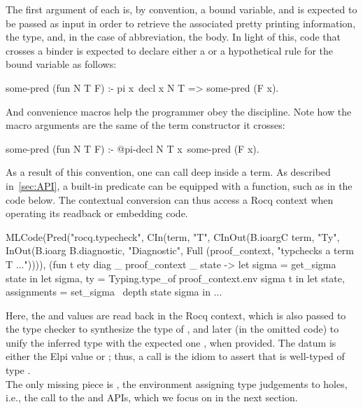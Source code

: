 \documentclass{these-ISSS}
\newenvironment{elpicode}
  {\VerbatimEnvironment\begin{elpibox}\begin{xelpicode}}{\end{xelpicode}
\end{elpibox}}
\newenvironment{ocamlcode}
  {\VerbatimEnvironment\begin{ocamlbox}\begin{xocamlcode}}{\end{xocamlcode}
\end{ocamlbox}}
\begin{document}
The first argument of each is, by convention, a bound variable, and is
expected to be passed as input in order to retrieve the associated pretty
printing information, the type, and, in the case of abbreviation, the body. In
light of this, code that crosses a binder is expected to declare either a
 or a  hypothetical rule for the bound variable as
follows:
\begin{elpicode}
some-pred (fun N T F) :-
  pi x\ decl x N T => some-pred (F x).
\end{elpicode}
\noindent
And convenience macros help the programmer obey the discipline. Note how
the macro arguments are the same of the term constructor it crosses:
\begin{elpicode}
some-pred (fun N T F) :-
  @pi-decl N T x\ some-pred (F x).
\end{elpicode}
\noindent
As a result of this convention, one can call  deep inside
a term. As described in~\cref{sec:API}, a built-in predicate can be equipped with a
 function, such as  in the code
below. The  contextual conversion can thus access a Rocq context
when operating its readback or embedding code.

\begin{ocamlcode}
MLCode(Pred("rocq.typecheck",
  CIn(term, "T",
  CInOut(B.ioargC term, "Ty",
  InOut(B.ioarg B.diagnostic, "Diagnostic",
  Full (proof_context, "typchecks a term T ...")))),
    (fun t ety diag _ proof_context _ state ->
      let sigma = get_sigma state in
      let sigma, ty = Typing.type_of proof_context.env sigma t in
      let state, assignments = set_sigma ~depth state sigma in
      ...
\end{ocamlcode}


Here, the  and  values are read back in the
 Rocq context, which is also passed to the type
checker to synthesize the type of , and later (in the omitted code)
to unify the inferred type with the expected one , when provided.
The  datum is either the Elpi value  or
; thus, a call  is the
idiom to assert that  is well-typed of type .
~\\

The only missing piece is , the environment assigning type
judgements to holes, i.e., the call to the  and
 APIs, which we focus on in the next section.
\end{document}
